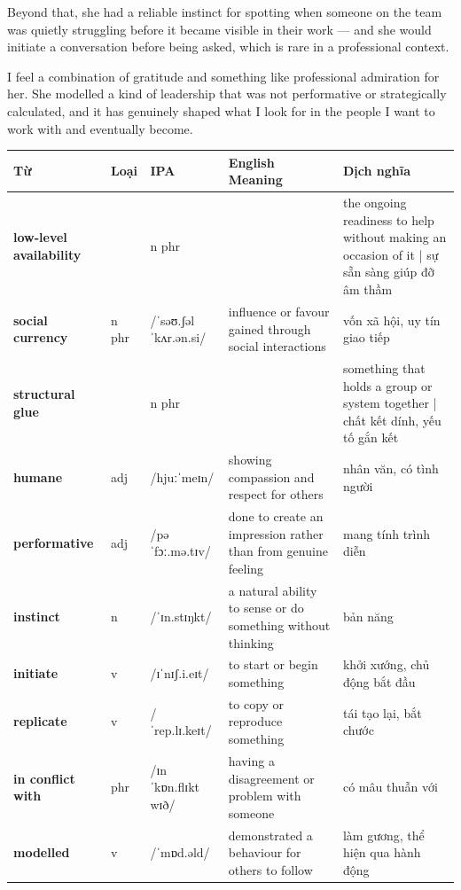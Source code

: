 \begin{ieltsanswer}
Beyond that, she had a reliable instinct for spotting when someone on the team was quietly struggling before it became visible in their work — and she would initiate a conversation before being asked, which is rare in a professional context.

I feel a combination of gratitude and something like professional admiration for her. She modelled a kind of leadership that was not performative or strategically calculated, and it has genuinely shaped what I look for in the people I want to work with and eventually become.
\end{ieltsanswer}


\vspace{0.8em}
\begin{center}
\renewcommand{\arraystretch}{1.65}
\begin{tabularx}{\textwidth}{|V{0.22\textwidth}|C{0.07\textwidth}|I{0.20\textwidth}|Y|V{0.18\textwidth}|}
\hline
{}
\textbf{Từ} & \textbf{Loại} & \textbf{IPA} & \textbf{English Meaning} & \textbf{Dịch nghĩa} \\
\hline
\textbf{low-level availability} & & n phr & & the ongoing readiness to help without making an occasion of it | sự sẵn sàng giúp đỡ âm thầm \\ \hline
\textbf{social currency} & n phr & /ˈsəʊ.ʃəl ˈkʌr.ən.si/ & influence or favour gained through social interactions & vốn xã hội, uy tín giao tiếp \\ \hline
\textbf{structural glue} & & n phr & & something that holds a group or system together | chất kết dính, yếu tố gắn kết \\ \hline
\textbf{humane} & adj & /hjuːˈmeɪn/ & showing compassion and respect for others & nhân văn, có tình người \\ \hline
\textbf{performative} & adj & /pəˈfɔː.mə.tɪv/ & done to create an impression rather than from genuine feeling & mang tính trình diễn \\ \hline
\textbf{instinct} & n & /ˈɪn.stɪŋkt/ & a natural ability to sense or do something without thinking & bản năng \\ \hline
\textbf{initiate} & v & /ɪˈnɪʃ.i.eɪt/ & to start or begin something & khởi xướng, chủ động bắt đầu \\ \hline
\textbf{replicate} & v & /ˈrep.lɪ.keɪt/ & to copy or reproduce something & tái tạo lại, bắt chước \\ \hline
\textbf{in conflict with} & phr & /ɪn ˈkɒn.flɪkt wɪð/ & having a disagreement or problem with someone & có mâu thuẫn với \\ \hline
\textbf{modelled} & v & /ˈmɒd.əld/ & demonstrated a behaviour for others to follow & làm gương, thể hiện qua hành động \\ \hline
\end{tabularx}
\end{center}

